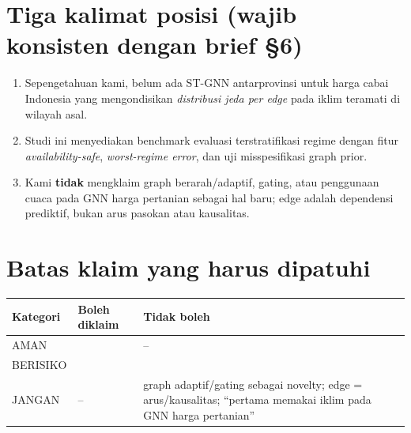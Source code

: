 \documentclass[11pt,a4paper]{article}
\begin{document}
\section{Tiga kalimat posisi (wajib konsisten dengan brief \S6)}
\begin{enumerate}
  \item Sepengetahuan kami, belum ada ST-GNN antarprovinsi untuk harga cabai
        Indonesia yang mengondisikan \emph{distribusi jeda per edge} pada iklim
        teramati di wilayah asal. 
  \item Studi ini menyediakan benchmark evaluasi terstratifikasi regime dengan
        fitur \emph{availability-safe}, \emph{worst-regime error}, dan uji
        misspesifikasi graph prior. 
  \item Kami \textbf{tidak} mengklaim graph berarah/adaptif, gating, atau
        penggunaan cuaca pada GNN harga pertanian sebagai hal baru; edge adalah
        dependensi prediktif, bukan arus pasokan atau kausalitas.
\end{enumerate}

\section{Batas klaim yang harus dipatuhi}
\begin{table}[H]
\centering
\small
\begin{tabular}{@{}L{2.4cm}L{6.6cm}L{5.4cm}@{}}
\toprule
Kategori & Boleh diklaim & Tidak boleh \\
\midrule
AMAN &  & -- \\
BERISIKO &  & \todo{} \\
JANGAN & -- & graph adaptif/gating sebagai novelty; edge = arus/kausalitas;
``pertama memakai iklim pada GNN harga pertanian'' \\
\bottomrule
\end{tabular}
\end{table}
\end{document}
